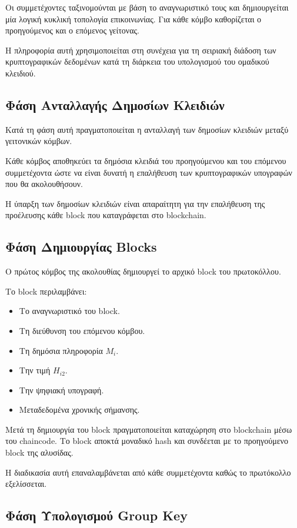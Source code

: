 \documentclass[12pt,a4paper]{report}
\begin{document}
Οι συμμετέχοντες ταξινομούνται με βάση το αναγνωριστικό τους και
δημιουργείται μία λογική κυκλική τοπολογία επικοινωνίας.
Για κάθε κόμβο καθορίζεται ο προηγούμενος και ο επόμενος γείτονας.

Η πληροφορία αυτή χρησιμοποιείται στη συνέχεια για τη σειριακή
διάδοση των κρυπτογραφικών δεδομένων κατά τη διάρκεια του
υπολογισμού του ομαδικού κλειδιού.

\subsection{Φάση Ανταλλαγής Δημοσίων Κλειδιών}

Κατά τη φάση αυτή πραγματοποιείται η ανταλλαγή των δημοσίων
κλειδιών μεταξύ γειτονικών κόμβων.

Κάθε κόμβος αποθηκεύει τα δημόσια κλειδιά του προηγούμενου και
του επόμενου συμμετέχοντα ώστε να είναι δυνατή η επαλήθευση των
κρυπτογραφικών υπογραφών που θα ακολουθήσουν.

Η ύπαρξη των δημοσίων κλειδιών είναι απαραίτητη για την
επαλήθευση της προέλευσης κάθε block που καταγράφεται στο
blockchain.

\subsection{Φάση Δημιουργίας Blocks}

Ο πρώτος κόμβος της ακολουθίας δημιουργεί το αρχικό block του
πρωτοκόλλου.

Το block περιλαμβάνει:

\begin{itemize}
\item Το αναγνωριστικό του block.
\item Τη διεύθυνση του επόμενου κόμβου.
\item Τη δημόσια πληροφορία $M_i$.
\item Την τιμή $H_{i2}$.
\item Την ψηφιακή υπογραφή.
\item Μεταδεδομένα χρονικής σήμανσης.
\end{itemize}

Μετά τη δημιουργία του block πραγματοποιείται καταχώρηση στο
blockchain μέσω του chaincode. Το block αποκτά μοναδικό hash και
συνδέεται με το προηγούμενο block της αλυσίδας.

Η διαδικασία αυτή επαναλαμβάνεται από κάθε συμμετέχοντα καθώς το
πρωτόκολλο εξελίσσεται.

\subsection{Φάση Υπολογισμού Group Key}
\end{document}
